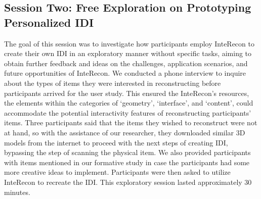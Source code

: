 


\subsection{Session Two: Free Exploration on Prototyping Personalized IDI}
\label{session-two}
The goal of this session was to investigate how participants employ InteRecon to create their own IDI in an exploratory manner without specific tasks, aiming to obtain further feedback and ideas on the challenges, application scenarios, and future opportunities of InteRecon.
We conducted a phone interview to inquire about the types of items they were interested in reconstructing before participants arrived for the user study.
This ensured the InteRecon's resources, the elements within the categories of `geometry', `interface', and `content', could accommodate the potential interactivity features of reconstructing participants' items. 
Three participants said that the items they wished to reconstruct were not at hand, so with the assistance of our researcher, they downloaded similar 3D models from the internet to proceed with the next steps of creating IDI, bypassing the step of scanning the physical item. 
We also provided participants with items mentioned in our formative study in case the participants had some more creative ideas to implement.
Participants were then asked to utilize InteRecon to recreate the IDI.
This exploratory session lasted approximately 30 minutes. 

